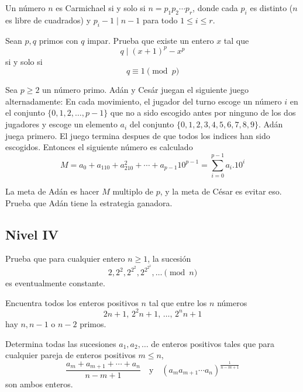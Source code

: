 \documentclass[11pt]{scrartcl}
\newcommand{\thmdifficulty}{0}
\newcommand{\problemdiff}[1]{\renewcommand{\thmdifficulty}{#1}}
\begin{document}
\problemdiff{5}
\begin{problem}
    Un número $n$ es Carmichael si y solo si $n=p_1p_2\cdots p_r$, donde cada $p_i$ es distinto ($n$ es libre de cuadrados) y $p_i-1 \mid n-1$ para todo $1\leq i \leq r$.
\end{problem}

\problemdiff{5}
\begin{problem}
    Sean $p,q$ primos con $q$ impar. Prueba que existe un entero $x$ tal que 
    \[ q \mid (x+1)^p-x^p \] 
    si y solo si 
    \[q \equiv 1 \pmod p\]
\end{problem}


\problemdiff{5.5}
\begin{problem}
    Sea $p \geq 2$ un número primo. Adán y Cesár juegan el siguiente juego alternadamente: En cada movimiento, el jugador del turno 
    escoge un número $i$ en el conjunto $\{0,1,2,\ldots, p-1\}$ que no a sido escogido antes por ninguno de los dos jugadores y escoge un elemento $a_i$ del conjunto $\{0,1,2,3,4,5,6,7,8,9\}$. Adán juega primero. El juego termina despues de que todos los indices han sido escogidos. Entonces el siguiente número es calculado 
    $$M=a_0+a_110+a_210^2+\cdots+a_{p-1}10^{p-1}= \sum_{i=0}^{p-1}a_i.10^i$$

    La meta de Adán es hacer $M$ multiplo de $p$, y la meta de César es evitar eso. \\
    Prueba que Adán tiene la estrategia ganadora. 
\end{problem}


\subsection{Nivel IV}
\problemdiff{6}
\begin{problem}
    Prueba que para cualquier entero $n\geq 1$, la sucesión 
    \[2, 2^2, 2^{2^2}, 2^{2^{2^{2}}}, \ldots \pmod n\]
    es eventualmente constante. 
\end{problem}

\problemdiff{6}
\begin{problem}
    Encuentra todos los enteros positivos $n$ tal que entre los $n$ números 
    \[ 2n + 1, \, 2^2 n + 1, \, \ldots, \, 2^n n + 1 \]
    hay $n, n-1$ o $n-2$ primos.
\end{problem}

\problemdiff{6}
\begin{problem}
    Determina todas las sucesiones $a_1, a_2, \ldots$ de enteros positivos tales que para cualquier pareja de enteros positivos $m \leq n$, 
    \[ \frac{a_m + a_{m+1} + \cdots + a_n}{n-m+1}\quad\text{y}\quad (a_ma_{m+1}\cdots a_n)^{\frac{1}{n-m+1}}\]
    son ambos enteros.
\end{problem}
\end{document}
